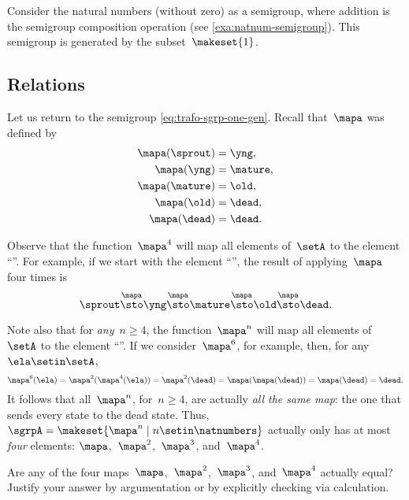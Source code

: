 \begin{example}
    Consider the natural numbers (without zero) as a semigroup, where addition is the semigroup composition operation (see \cref{exa:natnum-semigroup}).
    This semigroup is generated by the subset~$\makeset{1 }$.
\end{example}


\subsection{Relations}

Let us return to the semigroup \cref{eq:trafo-sgrp-one-gen}. Recall that~$\mapa$ was defined by
%
\begin{align*}
    \mapa(\sprout) & =  \yng, \\
    \mapa(\yng)    & =  \mature, \\
    \mapa(\mature) & =  \old, \\
    \mapa( \old)   & = \dead, \\
    \mapa(\dead)   & = \dead.
\end{align*}

Observe that the function~$\mapa^4$ will map all elements of~$\setA$ to the element ``\dead''.
For example, if we start with the element ``\sprout'', the result of applying~$\mapa$ four times is
%
\begin{equation}
    \sprout \overset{\mapa}{\sto} \yng \overset{\mapa}{\sto} \mature \overset{\mapa}{\sto} \old \overset{\mapa}{\sto} \dead.
\end{equation}

Note also that for \emph{any}~$n \geq 4$, the function~$\mapa^n$ will map all elements of~$\setA$ to the element ``\dead''.
If we consider~$\mapa^6$, for example, then, for any~$\ela \setin \setA$,
%
\begin{equation}
    \mapa^6(\ela) = \mapa^2(\mapa^4(\ela)) = \mapa^2(\dead) = \mapa(\mapa(\dead)) = \mapa(\dead) = \dead.
\end{equation}
%
It follows that all~$\mapa^n$, for~$n \geq 4$, are actually \emph{all the same map}: the one that sends every state to the dead state.
Thus, ~$\sgrpA = \makeset{ \mapa^n \mid n \setin \natnumbers }$ actually only has at most \emph{four} elements: $\mapa$,~$\mapa^2$,~$\mapa^3$, and~$\mapa^4$.

\begin{gradedexercise}
    \label{ex:CheckRelations}
    Are any of the four maps~$\mapa$,~$\mapa^2$,~$\mapa^3$, and~$\mapa^4$ actually equal?
    Justify your answer by argumentation or by explicitly checking via calculation.
\end{gradedexercise}


